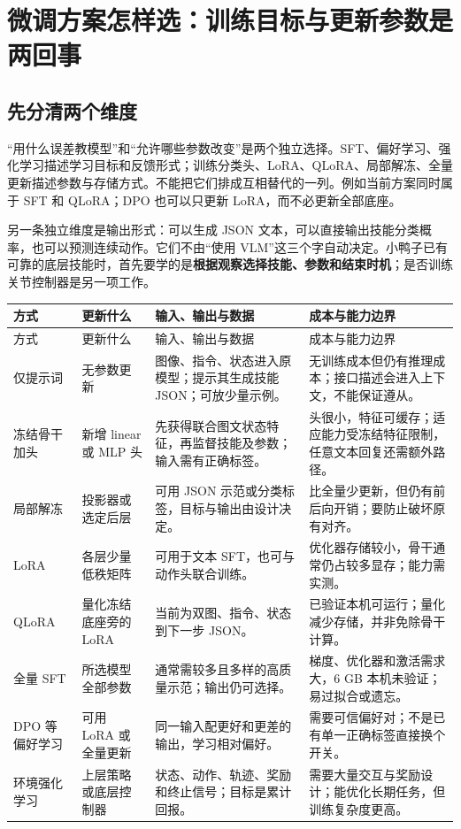 \chapter{微调方案怎样选：训练目标与更新参数是两回事}

\section{先分清两个维度}

“用什么误差教模型”和“允许哪些参数改变”是两个独立选择。SFT、偏好学习、强化学习描述学习目标和反馈形式；训练分类头、LoRA、QLoRA、局部解冻、全量更新描述参数与存储方式。不能把它们排成互相替代的一列。例如当前方案同时属于 SFT 和 QLoRA；DPO 也可以只更新 LoRA，而不必更新全部底座。

另一条独立维度是输出形式：可以生成 JSON 文本，可以直接输出技能分类概率，也可以预测连续动作。它们不由“使用 VLM”这三个字自动决定。小鸭子已有可靠的底层技能时，首先要学的是\textbf{根据观察选择技能、参数和结束时机}；是否训练关节控制器是另一项工作。

\begin{longtable}{@{}>{\raggedright\arraybackslash}p{2.0cm}>{\raggedright\arraybackslash}p{3.0cm}>{\raggedright\arraybackslash}p{5.0cm}>{\raggedright\arraybackslash}p{4.5cm}@{}}
\hline 方式 & 更新什么 & 输入、输出与数据 & 成本与能力边界 \\
\hline
\endfirsthead
\hline 方式 & 更新什么 & 输入、输出与数据 & 成本与能力边界 \\ \hline
\endhead
仅提示词 & 无参数更新 & 图像、指令、状态进入原模型；提示其生成技能 JSON；可放少量示例。 & 无训练成本但仍有推理成本；接口描述会进入上下文，不能保证遵从。\\
冻结骨干加头 & 新增 linear 或 MLP 头 & 先获得联合图文状态特征，再监督技能及参数；输入需有正确标签。 & 头很小，特征可缓存；适应能力受冻结特征限制，任意文本回复还需额外路径。\\
局部解冻 & 投影器或选定后层 & 可用 JSON 示范或分类标签，目标与输出由设计决定。 & 比全量少更新，但仍有前后向开销；要防止破坏原有对齐。\\
LoRA & 各层少量低秩矩阵 & 可用于文本 SFT，也可与动作头联合训练。 & 优化器存储较小，骨干通常仍占较多显存；能力需实测。\\
QLoRA & 量化冻结底座旁的 LoRA & 当前为双图、指令、状态到下一步 JSON。 & 已验证本机可运行；量化减少存储，并非免除骨干计算。\\
全量 SFT & 所选模型全部参数 & 通常需较多且多样的高质量示范；输出仍可选择。 & 梯度、优化器和激活需求大，6 GB 本机未验证；易过拟合或遗忘。\\
DPO 等偏好学习 & 可用 LoRA 或全量更新 & 同一输入配更好和更差的输出，学习相对偏好。 & 需要可信偏好对；不是已有单一正确标签直接换个开关。\\
环境强化学习 & 上层策略或底层控制器 & 状态、动作、轨迹、奖励和终止信号；目标是累计回报。 & 需要大量交互与奖励设计；能优化长期任务，但训练复杂度更高。\\
\hline
\end{longtable}

